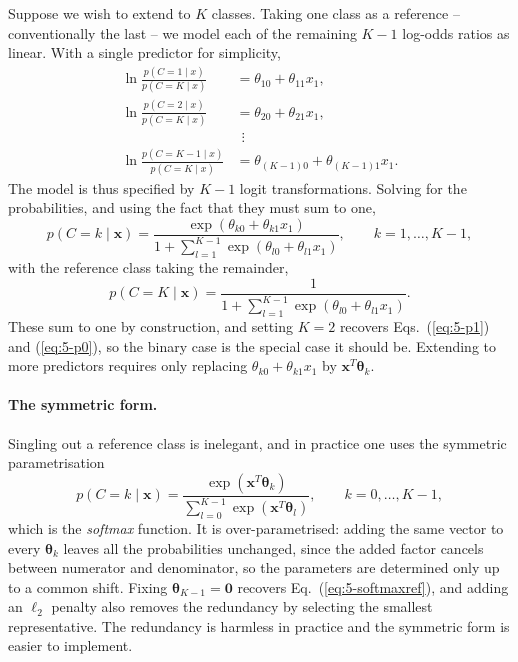 Suppose we wish to extend to $K$ classes.  Taking one class as a reference --
conventionally the last -- we model each of the remaining $K-1$ log-odds
ratios as linear.  With a single predictor for simplicity,
\begin{align}
  \ln\frac{p(C=1\mid x)}{p(C=K\mid x)} &= \theta_{10}+\theta_{11}x_1,
    \nonumber\\
  \ln\frac{p(C=2\mid x)}{p(C=K\mid x)} &= \theta_{20}+\theta_{21}x_1,
    \nonumber\\
  &\ \ \vdots \nonumber\\
  \ln\frac{p(C=K-1\mid x)}{p(C=K\mid x)}
    &= \theta_{(K-1)0}+\theta_{(K-1)1}x_1 .
  \label{eq:5-multilogit}
\end{align}
The model is thus specified by $K-1$ logit transformations.  Solving for the
probabilities, and using the fact that they must sum to one,
\begin{equation}
  p(C=k\mid\bm{x}) =
    \frac{\exp\left(\theta_{k0}+\theta_{k1}x_1\right)}
         {1+\sum_{l=1}^{K-1}\exp\left(\theta_{l0}+\theta_{l1}x_1\right)},
  \qquad k=1,\dots,K-1,
  \label{eq:5-softmaxref}
\end{equation}
with the reference class taking the remainder,
\begin{equation}
  p(C=K\mid\bm{x}) =
    \frac{1}{1+\sum_{l=1}^{K-1}\exp\left(\theta_{l0}+\theta_{l1}x_1\right)} .
  \label{eq:5-softmaxlast}
\end{equation}
These sum to one by construction, and setting $K=2$ recovers
Eqs.~(\ref{eq:5-p1}) and (\ref{eq:5-p0}), so the binary case is the special
case it should be.  Extending to more predictors requires only replacing
$\theta_{k0}+\theta_{k1}x_1$ by $\bm{x}^{T}\bm{\theta}_k$.

\paragraph{The symmetric form.}
Singling out a reference class is inelegant, and in practice one uses the
symmetric parametrisation
\begin{equation}
  \boxed{\;
  p(C=k\mid\bm{x}) = \frac{\exp\left(\bm{x}^{T}\bm{\theta}_k\right)}
    {\sum_{l=0}^{K-1}\exp\left(\bm{x}^{T}\bm{\theta}_l\right)},
  \qquad k=0,\dots,K-1, \;}
  \label{eq:5-softmax}
\end{equation}
which is the \emph{softmax} function.  It is over-parametrised: adding the
same vector to every $\bm{\theta}_k$ leaves all the probabilities unchanged,
since the added factor cancels between numerator and denominator, so the
parameters are determined only up to a common shift.  Fixing
$\bm{\theta}_{K-1}=\bm{0}$ recovers Eq.~(\ref{eq:5-softmaxref}), and adding an
$\ell_2$ penalty also removes the redundancy by selecting the smallest
representative.  The redundancy is harmless in practice and the symmetric form
is easier to implement.

